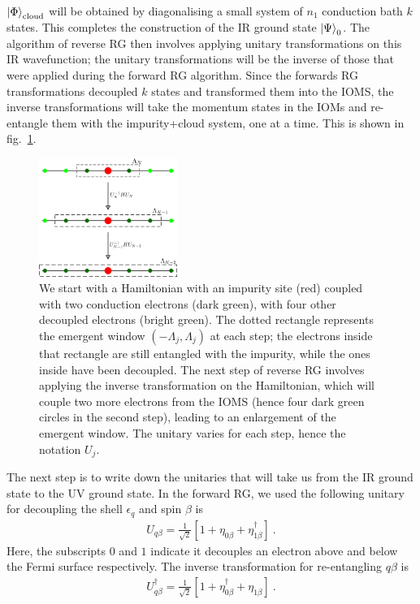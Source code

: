 \documentclass[prb]{revtex4-2}
\begin{document}
\(\ket{\Phi}_\text{cloud}\) will be obtained by diagonalising a small system of \(n_1\) conduction bath \(k\) states. This completes the construction of the IR ground state \(\ket{\Psi}_0\). The algorithm of reverse RG then involves applying unitary transformations on this IR wavefunction; the unitary transformations will be the inverse of those that were applied during the forward RG algorithm. Since the forwards RG transformations decoupled \(k\) states and transformed them into the IOMS, the inverse transformations will take the momentum states in the IOMs and re-entangle them with the impurity+cloud system, one at a time. This is shown in fig.~\ref{rev-rg}.
\begin{figure}[!htbp]
	\centering
	\includegraphics[width=0.4\textwidth]{reverse-rg.png}
	\caption{We start with a Hamiltonian with an impurity site (red) coupled with two conduction electrons (dark green), with four other decoupled electrons (bright green). The dotted rectangle represents the emergent window \(\left( -\Lambda_j, \Lambda_j \right) \) at each step; the electrons inside that rectangle are still entangled with the impurity, while the ones inside have been decoupled. The next step of reverse RG involves applying the inverse transformation on the Hamiltonian, which will couple two more electrons from the IOMS (hence four dark green circles in the second step), leading to an enlargement of the emergent window. The unitary varies for each step, hence the notation \(U_j\).}
	\label{rev-rg}
\end{figure}

The next step is to write down the unitaries that will take us from the IR ground state to the UV ground state. In the forward RG, we used the following unitary for decoupling the shell \(\epsilon_q\) and spin \(\beta\) is
\begin{equation}\begin{aligned}
	U_{q\beta} = \frac{1}{\sqrt 2}\left[1 + \eta_{0 \beta} + \eta_{1\beta}^\dagger\right]~.
\end{aligned}\end{equation}
Here, the subscripts \(0\) and \(1\) indicate it decouples an electron above and below the Fermi surface respectively. The inverse transformation for re-entangling \(q\beta\) is
\begin{equation}\begin{aligned}
	U^\dagger_{q\beta} = \frac{1}{\sqrt 2}\left[1 + \eta_{0 \beta}^\dagger + \eta_{1\beta}\right]~.
\end{aligned}\end{equation}
\end{document}
